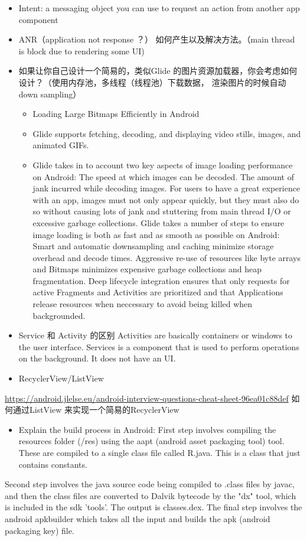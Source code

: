 \documentclass[11pt]{article}
\begin{document}
\begin{itemize}
\item Intent: a messaging object you can use to request an action from another app component
\end{itemize}
\begin{itemize}
\item ANR（application not response ？） 如何产生以及解决方法。（main thread is block due to rendering some UI)

\item 如果让你自己设计一个简易的，类似Glide 的图片资源加载器，你会考虑如何设计？（使用内存池，多线程（线程池）下载数据，
渲染图片的时候自动down sampling）
\begin{itemize}
\item Loading Large Bitmaps Efficiently in Android
\item Glide supports fetching, decoding, and displaying video stills, images, and animated GIFs.
\item Glide takes in to account two key aspects of image loading performance on Android:
The speed at which images can be decoded.
The amount of jank incurred while decoding images.
For users to have a great experience with an app, images must not only appear quickly, but they must also do so without causing lots of jank and stuttering from main thread I/O or excessive garbage collections.
Glide takes a number of steps to ensure image loading is both as fast and as smooth as possible on Android:
Smart and automatic downsampling and caching minimize storage overhead and decode times.
Aggressive re-use of resources like byte arrays and Bitmaps minimizes expensive garbage collections and heap fragmentation.
Deep lifecycle integration ensures that only requests for active Fragments and Activities are prioritized and that Applications release resources when neccessary to avoid being killed when backgrounded.
\end{itemize}
\item Service 和 Activity 的区别
Activities are basically containers or windows to the user interface. Services is a component that is used to perform operations on the background. It does not have an UI.
\item RecyclerView/ListView
\end{itemize}
\url{https://android.jlelse.eu/android-interview-questions-cheat-sheet-96ea01c88def}
  如何通过ListView 来实现一个简易的RecyclerView
\begin{itemize}
\item Explain the build process in Android:
First step involves compiling the resources folder (/res) using the aapt (android asset packaging tool) tool. These are compiled to a single class file called R.java. This is a class that just contains constants.
\end{itemize}
Second step involves the java source code being compiled to .class files by javac, and then the class files are converted to Dalvik bytecode by the "dx" tool, which is included in the sdk 'tools'. The output is classes.dex.
The final step involves the android apkbuilder which takes all the input and builds the apk (android packaging key) file.
\end{document}
